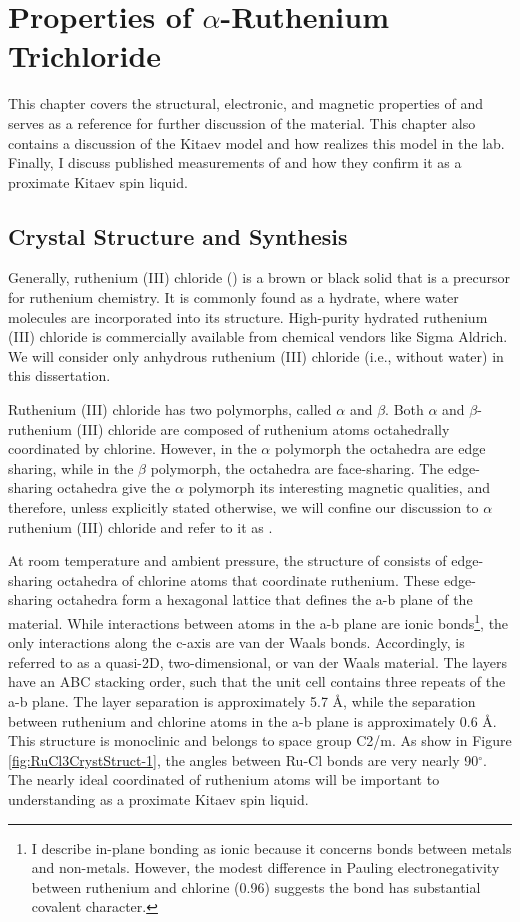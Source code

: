 \chapter{Properties of \texorpdfstring{$\alpha$-Ruthenium Trichloride}{alpha-RuCl3}}
This chapter covers the structural, electronic, and magnetic properties of \rucl and serves as a reference for further discussion of the material. This chapter also contains a discussion of the Kitaev model and how \rucl realizes this model in the lab. Finally, I discuss published measurements of \rucl and how they confirm it as a proximate Kitaev spin liquid.

\section{Crystal Structure and Synthesis}

Generally, ruthenium (III) chloride (\ruclnospace) is a brown or black solid that is a precursor for 	ruthenium chemistry. It is commonly found as a hydrate, where water molecules are incorporated into its structure. High-purity hydrated ruthenium (III) chloride is commercially available from chemical vendors like Sigma Aldrich. We will consider only anhydrous ruthenium (III) chloride (i.e., without water) in this dissertation.

Ruthenium (III) chloride has two polymorphs, called $\alpha$ and $\beta$. Both $\alpha$ and $\beta$-ruthenium (III) chloride are composed of ruthenium atoms octahedrally coordinated by chlorine. However, in the $\alpha$ polymorph the octahedra are edge sharing, while in the $\beta$ polymorph, the octahedra are face-sharing. The edge-sharing octahedra give the $\alpha$ polymorph its interesting magnetic qualities, and therefore, unless explicitly stated otherwise, we will confine our discussion to $\alpha$ ruthenium (III) chloride and refer to it as \ruclnospace .

At room temperature and ambient pressure, the structure of \rucl consists of edge-sharing octahedra of chlorine atoms that coordinate ruthenium. These edge-sharing octahedra form a hexagonal lattice that defines the a-b plane of the material. While interactions between atoms in the a-b plane are ionic bonds\footnote{I describe in-plane bonding as ionic because it concerns bonds between metals and non-metals. However, the modest difference in Pauling electronegativity between ruthenium and chlorine (0.96) suggests the bond has substantial covalent character.}, the only interactions along the c-axis are van der Waals bonds. Accordingly, \rucl is referred to as a quasi-2D, two-dimensional, or van der Waals material. The layers have an ABC stacking order, such that the unit cell contains three repeats of the a-b plane. The layer separation is approximately 5.7 \AA, while the separation between ruthenium and chlorine atoms in the a-b plane is approximately 0.6 \AA. This structure is monoclinic and belongs to space group C2/m. As show in Figure \ref{fig:RuCl3CrystStruct-1}, the angles between Ru-Cl bonds are very nearly 90$^{\circ}$. The nearly ideal coordinated of ruthenium atoms will be important to understanding \rucl as a proximate Kitaev spin liquid.

